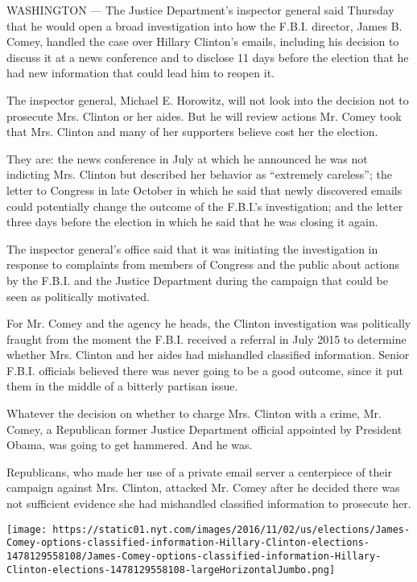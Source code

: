 WASHINGTON --- The Justice Department's inspector general said Thursday
that he would open a broad investigation into how the F.B.I. director,
James B. Comey, handled the case over Hillary Clinton's emails,
including his decision to discuss it at a news conference and to
disclose 11 days before the election that he had new information that
could lead him to reopen it.

The inspector general, Michael E. Horowitz, will not look into the
decision not to prosecute Mrs. Clinton or her aides. But he will review
actions Mr. Comey took that Mrs. Clinton and many of her supporters
believe cost her the election.

They are: the news conference in July at which he announced he was not
indicting Mrs. Clinton but described her behavior as ``extremely
careless''; the letter to Congress in late October in which he said that
newly discovered emails could potentially change the outcome of the
F.B.I.'s investigation; and the letter three days before the election in
which he said that he was closing it again.

The inspector general's office said that it was initiating the
investigation in response to complaints from members of Congress and the
public about actions by the F.B.I. and the Justice Department during the
campaign that could be seen as politically motivated.

For Mr. Comey and the agency he heads, the Clinton investigation was
politically fraught from the moment the F.B.I. received a referral in
July 2015 to determine whether Mrs. Clinton and her aides had mishandled
classified information. Senior F.B.I. officials believed there was never
going to be a good outcome, since it put them in the middle of a
bitterly partisan issue.

Whatever the decision on whether to charge Mrs. Clinton with a crime,
Mr. Comey, a Republican former Justice Department official appointed by
President Obama, was going to get hammered. And he was.

Republicans, who made her use of a private email server a centerpiece of
their campaign against Mrs. Clinton, attacked Mr. Comey after he decided
there was not sufficient evidence she had mishandled classified
information to prosecute her.

\href{https://www.nytimes.com/interactive/2016/11/02/us/elections/James-Comey-options-classified-information-Hillary-Clinton-elections.html}{}

\texttt{[image: https://static01.nyt.com/images/2016/11/02/us/elections/James-Comey-options-classified-information-Hillary-Clinton-elections-1478129558108/James-Comey-options-classified-information-Hillary-Clinton-elections-1478129558108-largeHorizontalJumbo.png]}

